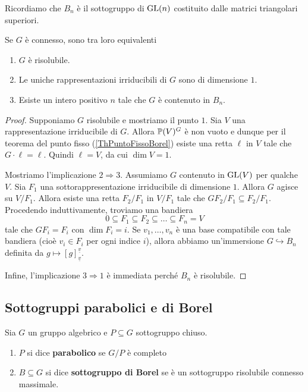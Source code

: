 Ricordiamo che $B_n$ è il sottogruppo di $\mathrm{GL}(n)$ costituito dalle matrici triangolari superiori.

\begin{corollary}\label{CorCaratterizzazioneConnessiRisolubili}
    Se $G$ è connesso, sono tra loro equivalenti \begin{enumerate}
        \item $G$ è risolubile.
        \item Le uniche rappresentazioni irriducibili di $G$ sono di dimensione $1$.
        \item Esiste un intero positivo $n$ tale che $G$ è contenuto in $B_n$. 
    \end{enumerate}    
\end{corollary}
\begin{proof}
    Supponiamo $G$ risolubile e mostriamo il punto $1$. Sia $V$ una rappresentazione irriducibile di $G$. Allora $\mathbb{P}(V)^G$ è non vuoto e dunque per il teorema del punto fisso (\ref{ThPuntoFissoBorel}) esiste una retta $\ell$ in $V$ tale che $G\cdot\ell=\ell$. Quindi $\ell=V$, da cui $\dim V=1$.

    Mostriamo l'implicazione $2\Rightarrow 3$. Assumiamo $G$ contenuto in $\mathrm{GL}(V)$ per qualche $V$. Sia $F_1$ una sottorappresentazione irriducibile di dimensione $1$. Allora $G$ agisce su $V/F_1$. Allora esiste una retta $F_2/F_1$ in $V/F_1$ tale che $G F_2/F_1 \subseteq F_2/F_1$. Procedendo induttivamente, troviamo una bandiera \[0\subseteq F_1\subseteq F_2 \subseteq \ldots \subseteq F_n =V\] tale che $G F_i=F_i$ con $\dim F_i=i$. Se $v_1,\ldots,v_n$ è una base compatibile con tale bandiera (cioè $v_i\in F_i$ per ogni indice $i$), allora abbiamo un'immersione $G \hookrightarrow B_n$ definita da $g\mapsto [g]_{\underline{v}}^{\underline{v}}$. 

    Infine, l'implicazione $3 \Rightarrow 1$ è immediata perché $B_n$ è risolubile.
\end{proof}



\subsection{Sottogruppi parabolici e di Borel}
\begin{definition}
Sia $G$ un gruppo algebrico e $P\subseteq G$ sottogruppo chiuso.
\begin{enumerate}
	\item $P$ si dice \textbf{parabolico} se $G/P$ \`e completo
	\item $B\subseteq G$ si dice \textbf{sottogruppo di Borel} se \`e un sottogruppo risolubile connesso massimale.
\end{enumerate}
\end{definition}

